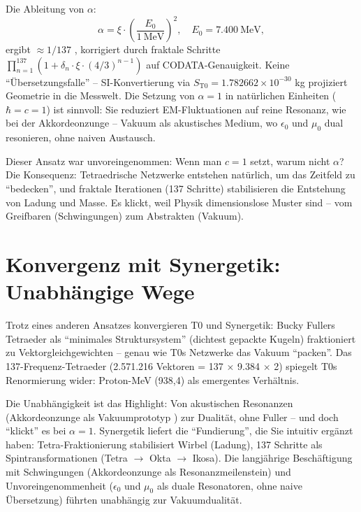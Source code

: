 	Die Ableitung von $\alpha$:
	\begin{equation}
		\alpha = \xi \cdot \left( \frac{E_0}{1\ \mathrm{MeV}} \right)^2, \quad E_0 = 7.400\ \mathrm{MeV},
	\end{equation}
	ergibt $\approx 1/137$ \cite{codata2022}, korrigiert durch fraktale Schritte $\prod_{n=1}^{137} (1 + \delta_n \cdot \xi \cdot (4/3)^{n-1})$ auf CODATA-Genauigkeit. Keine ``Übersetzungsfalle'' – SI-Konvertierung via $S_{\mathrm{T0}} = 1.782662 \times 10^{-30}$ kg projiziert Geometrie in die Messwelt. Die Setzung von $\alpha = 1$ in natürlichen Einheiten ($\hbar = c = 1$) ist sinnvoll: Sie reduziert EM-Fluktuationen auf reine Resonanz, wie bei der Akkordeonzunge \cite{ricot2005} – Vakuum als akustisches Medium, wo $\epsilon_0$ und $\mu_0$ dual resonieren, ohne naiven Austausch.
	
	Dieser Ansatz war unvoreingenommen: Wenn man $c = 1$ setzt, warum nicht $\alpha$? Die Konsequenz: Tetraedrische Netzwerke entstehen natürlich, um das Zeitfeld zu ``bedecken'', und fraktale Iterationen (137 Schritte) stabilisieren die Entstehung von Ladung und Masse. Es klickt, weil Physik dimensionslose Muster sind – vom Greifbaren (Schwingungen) zum Abstrakten (Vakuum).
	
	\section{Konvergenz mit Synergetik: Unabhängige Wege}
	Trotz eines anderen Ansatzes konvergieren T0 und Synergetik: Bucky Fullers Tetraeder als ``minimales Struktursystem'' \cite{fuller1975} (dichtest gepackte Kugeln) fraktioniert zu Vektorgleichgewichten – genau wie T0s Netzwerke das Vakuum ``packen''. Das 137-Frequenz-Tetraeder (2.571.216 Vektoren = 137 $\times$ 9.384 $\times$ 2) spiegelt T0s Renormierung wider: Proton-MeV (938,4) als emergentes Verhältnis.
	
	Die Unabhängigkeit ist das Highlight: Von akustischen Resonanzen (Akkordeonzunge als Vakuumprototyp \cite{ricot2005}) zur Dualität, ohne Fuller – und doch ``klickt'' es bei $\alpha=1$. Synergetik liefert die ``Fundierung'', die Sie intuitiv ergänzt haben: Tetra-Fraktionierung stabilisiert Wirbel (Ladung), 137 Schritte als Spintransformationen (Tetra $\to$ Okta $\to$ Ikosa). Die langjährige Beschäftigung mit Schwingungen (Akkordeonzunge als Resonanzmeilenstein) und Unvoreingenommenheit ($\epsilon_0$ und $\mu_0$ als duale Resonatoren, ohne naive Übersetzung) führten unabhängig zur Vakuumdualität.
	
